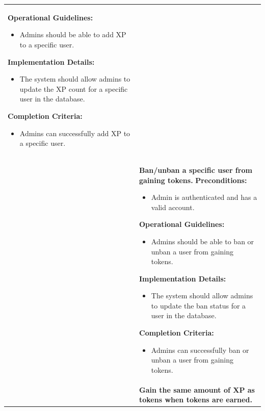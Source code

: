 \begin{longtable}{ | p{} | p{} | }
    \textbf{Operational Guidelines:} \newline
    \begin{itemize}
        \item Admins should be able to add XP to a specific user.
    \end{itemize}
    \textbf{Implementation Details:} \newline
    \begin{itemize}
        \item The system should allow admins to update the XP count for a specific user in the database.
    \end{itemize}
    \textbf{Completion Criteria:} \newline
    \begin{itemize}
        \item Admins can successfully add XP to a specific user.
    \end{itemize} \\
    \cline{2-2}
    & \textbf{Ban/unban a specific user from gaining tokens.} \newline
    \textbf{Preconditions:} \newline
    \begin{itemize}
        \item Admin is authenticated and has a valid account.
    \end{itemize}
    \textbf{Operational Guidelines:} \newline
    \begin{itemize}
        \item Admins should be able to ban or unban a user from gaining tokens.
    \end{itemize}
    \textbf{Implementation Details:} \newline
    \begin{itemize}
        \item The system should allow admins to update the ban status for a user in the database.
    \end{itemize}
    \textbf{Completion Criteria:} \newline
    \begin{itemize}
        \item Admins can successfully ban or unban a user from gaining tokens.
    \end{itemize} \\
    \cline{2-2}
    & \textbf{Gain the same amount of XP as tokens when tokens are earned.} \newline

\end{longtable}
